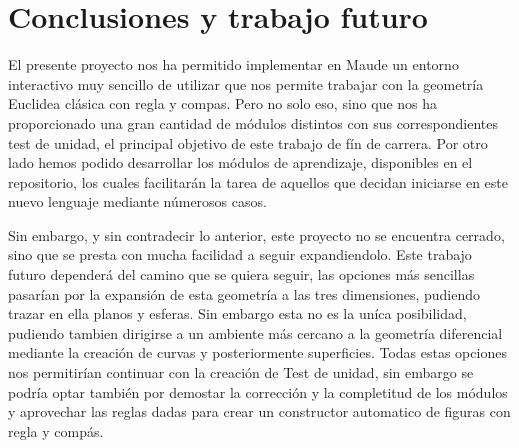 
\section{Conclusiones y trabajo futuro}

El presente proyecto nos ha permitido implementar en Maude un entorno interactivo muy sencillo de utilizar que nos permite trabajar con la geometría Euclidea clásica con regla y compas. Pero no solo eso, sino que nos ha proporcionado una gran cantidad de módulos distintos con sus correspondientes test de unidad, el principal objetivo de este trabajo de fín de carrera. Por otro lado hemos podido desarrollar los módulos de aprendizaje, disponibles en el repositorio, los cuales facilitarán la tarea de aquellos que decidan iniciarse en este nuevo lenguaje mediante númerosos casos. \par

Sin embargo, y sin contradecir lo anterior, este proyecto no se encuentra cerrado, sino que se presta con mucha facilidad a seguir expandiendolo. Este trabajo futuro dependerá del camino que se quiera seguir, las opciones más sencillas pasarían por la expansión de esta geometría a las tres dimensiones, pudiendo trazar en ella planos y esferas. Sin embargo esta no es la uníca posibilidad, pudiendo tambien dirigirse a un ambiente más cercano a la geometría diferencial mediante la creación de curvas y posteriormente superficies. Todas estas opciones nos permitirían continuar con la creación de Test de unidad, sin embargo se podría optar también por demostar la corrección y la completitud de los módulos y aprovechar las reglas dadas para crear un constructor automatico de figuras con regla y compás.
